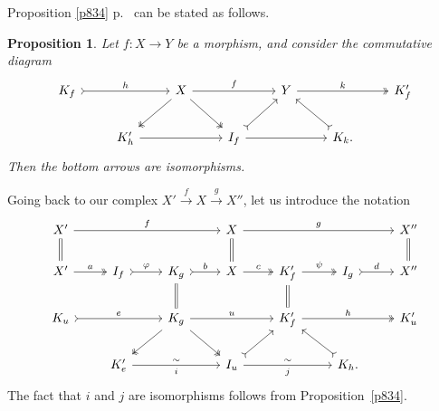\documentclass[12pt]{article}%
\newtheorem{prop}[thm]{Proposition}
\theoremstyle{remark}
\theoremstyle{definition}
\begin{document}
Proposition \ref{p834} p.~\pageref{p834} can be stated as follows. 
%
\begin{prop}\label{p834b}
Let $f:X\to Y$ be a morphism, and consider the commutative diagram 
$$
\begin{tikzcd}
K_f\ar[tail]{rr}{h}&&X\ar{rr}{f}\ar[two heads]{dl}\ar[two heads]{dr}&&Y\ar[two heads]{rr}{k}&&K'_f\\ 
&K'_h\ar{rr}&&I_f\ar[tail]{ur}\ar{rr}&&K_k.\ar[tail]{ul}
\end{tikzcd}
$$ 
Then the bottom arrows are isomorphisms.
\end{prop}
%
Going back to our complex $X'\overset{f}{\to}X\overset{g}{\to}X''$, let us introduce the notation 
$$
\begin{tikzcd}
X'\ar{rrr}{f}\ar[equal]{d}&&&X\ar[equal]{d}\ar{rrr}{g}&&&X''\ar[equal]{d}\\ 
X'\ar[two heads]{r}{a}&I_f\ar[tail]{r}{\varphi}&K_g\ar[equal]{d}\ar[tail]{r}{b}&X\ar[two heads]{r}{c}&K'_f\ar[equal]{d}\ar[two heads]{r}{\psi}&I_g\ar[tail]{r}{d}&X''\\ 
K_u\ar[tail]{rr}{e}&&K_g\ar[two heads]{dl}\ar[two heads]{dr}\ar{rr}{u}&&K'_f\ar[two heads]{rr}{h}&&K'_u\\ 
&K'_e\ar{rr}{\sim}[swap]{i}&&I_u\ar[tail]{ur}\ar{rr}{\sim}[swap]{j}&&K_h.\ar[tail]{ul}
\end{tikzcd}
$$ 
The fact that $i$ and $j$ are isomorphisms follows from Proposition~\ref{p834}. 
\end{document}
